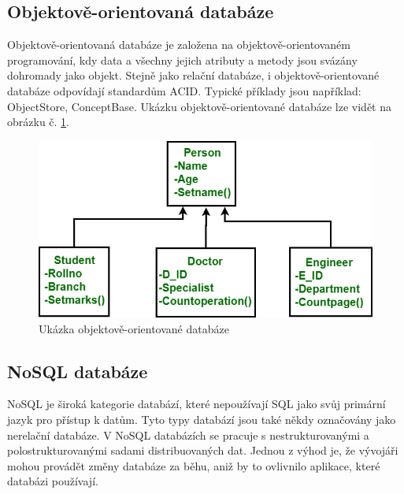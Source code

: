 \subsection{Objektově-orientovaná databáze}
Objektově-orientovaná databáze je založena na objektově-orientovaném programování, kdy data a všechny jejich atributy a metody jsou svázány dohromady jako objekt. Stejně jako relační databáze, i objektově-orientované databáze odpovídají standardům \gls{ACID}. Typické příklady jsou například: ObjectStore, ConceptBase. Ukázku objektově-orientované databáze lze vidět na obrázku č. \ref{fig:db_img_oo}.
	\begin{figure}[H]
	\centering
	\includegraphics[width=12cm]{img/databaze/oo_db}
	\caption{Ukázka objektově-orientované databáze}
	\label{fig:db_img_oo}
	\end{figure}
\subsection{NoSQL databáze}
NoSQL je široká kategorie databází, které nepoužívají \gls{SQL} jako svůj primární jazyk pro přístup k datům. Tyto typy databází jsou také někdy označovány jako nerelační databáze. V NoSQL databázích se pracuje s nestrukturovanými a polostrukturovanými sadami distribuovaných dat. Jednou z výhod je, že vývojáři mohou provádět změny databáze za běhu, aniž by to ovlivnilo aplikace, které databázi používají.
